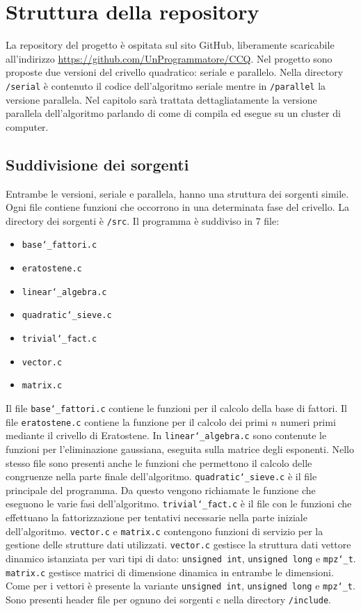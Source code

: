 \section{Struttura della repository}
\label{sec:struttura}
La repository del progetto è ospitata sul sito GitHub, liberamente
scaricabile all'indirizzo \url{https://github.com/UnProgrammatore/CCQ}.
Nel progetto sono proposte due versioni del crivello quadratico:
seriale e parallelo. Nella directory \texttt{/serial} è contenuto 
il codice dell'algoritmo seriale mentre in \texttt{/parallel} la versione
parallela. Nel capitolo sarà trattata dettagliatamente la versione
parallela dell'algoritmo parlando di come di compila ed esegue su un
cluster di computer.
\subsection{Suddivisione dei sorgenti}
Entrambe le versioni, seriale e parallela, hanno una struttura dei sorgenti simile.
Ogni file contiene funzioni che occorrono in una determinata fase del
crivello. La directory dei sorgenti è \texttt{/src}. Il programma è
suddiviso in 7 file:
\begin{itemize}
\item \texttt{base\char`_fattori.c}
\item \texttt{eratostene.c}
\item \texttt{linear\char`_algebra.c}
\item \texttt{quadratic\char`_sieve.c}
\item \texttt{trivial\char`_fact.c}
\item \texttt{vector.c}
\item \texttt{matrix.c}
\end{itemize}
Il file \texttt{base\char`_fattori.c} contiene le funzioni per il
calcolo della base di fattori. Il file \texttt{eratostene.c} contiene
la funzione per il calcolo dei primi $n$ numeri primi mediante il
crivello di Eratostene. In \texttt{linear\char`_algebra.c} sono
contenute  le funzioni per l'eliminazione gaussiana, eseguita sulla
matrice degli esponenti. Nello stesso file sono presenti anche le
funzioni che permettono il calcolo delle congruenze nella parte
finale dell'algoritmo. \texttt{quadratic\char`_sieve.c} è il file
principale del programma. Da questo vengono richiamate 
le funzione che eseguono le varie fasi
dell'algoritmo. \texttt{trivial\char`_fact.c} è il file con le
funzioni che effettuano la fattorizzazione per tentativi necessarie
nella parte iniziale dell'algoritmo. \texttt{vector.c} e
\texttt{matrix.c} contengono funzioni di servizio per la
gestione delle strutture dati utilizzati. \texttt{vector.c} gestisce
la struttura dati vettore dinamico istanziata per vari tipi di dato:
\texttt{unsigned int}, \texttt{unsigned long} e \texttt{mpz\char`_t}. 
\texttt{matrix.c} gestisce matrici di dimensione dinamica in entrambe le
dimensioni. Come per i vettori è presente la variante \texttt{unsigned
int}, \texttt{unsigned long} e \texttt{mpz\char`_t}.
Sono presenti header file per ognuno dei sorgenti c nella directory 
\texttt{/include}.
